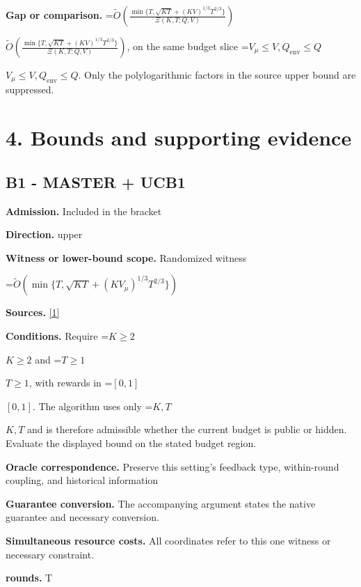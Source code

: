 \documentclass[10pt,a4paper]{article}
\newcommand{\AtlasMath}[1]{\par\begingroup\centering\setbox0=\hbox{$\displaystyle #1$}\ifdim\wd0>1.4\linewidth\typeout{ATLAS WIDE FORMULA: \the\wd0}\fi\ifdim\wd0>\linewidth\resizebox{\linewidth}{!}{\box0}\else\box0\fi\par\endgroup}
\newcommand{\AtlasInlineMath}[1]{\begingroup\setbox0=\hbox{$#1$}\ifdim\wd0>.4\linewidth\endgroup\AtlasMath{#1}\else\endgroup$#1$\fi}
\begin{document}
\textbf{Gap or comparison.} \AtlasInlineMath{\widetilde O\!\left(\frac{\min\{T,\sqrt{KT}+(KV)^{1/3}T^{2/3}\}}{\Xi(K,T;Q,V)}\right)}, on the same budget slice \AtlasInlineMath{V_\mu\le V, Q_{\mathrm{env}}\le Q}. Only the polylogarithmic factors in the source upper bound are suppressed.



\section{4. Bounds and supporting evidence}


\subsection{B1 - MASTER + UCB1}


\textbf{Admission.} Included in the bracket



\textbf{Direction.} upper



\textbf{Witness or lower-bound scope.} Randomized witness



\AtlasMath{\widetilde{O}\!\left(\min\{T,\sqrt{KT}+(KV_\mu)^{1/3}T^{2/3}\}\right)}


\textbf{Sources.} \href{https://proceedings.mlr.press/v134/wei21b.html}{[1]}



\textbf{Conditions.} Require \AtlasInlineMath{K\ge2} and \AtlasInlineMath{T\ge1}, with rewards in \AtlasInlineMath{[0,1]}. The algorithm uses only \AtlasInlineMath{K,T} and is therefore admissible whether the current budget is public or hidden. Evaluate the displayed bound on the stated budget region.



\textbf{Oracle correspondence.} Preserve this setting's feedback type, within-round coupling, and historical information



\textbf{Guarantee conversion.} The accompanying argument states the native guarantee and necessary conversion.



\textbf{Simultaneous resource costs.} All coordinates refer to this one witness or necessary constraint.



\textbf{rounds.} T
\end{document}
